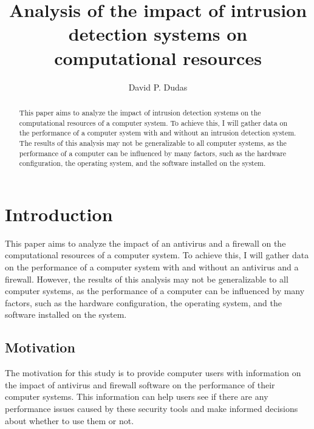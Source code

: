 \documentclass[runningheads,a4paper,english]{llncs}[2022/01/12]
\begin{document}
\title{Analysis of the impact of intrusion detection systems on computational resources}

\author{David P. Dudas}


\maketitle

\begin{abstract}

This paper aims to analyze the impact of intrusion detection systems on the
computational resources of a computer system. To achieve this, I will gather
data on the performance of a computer system with and without an intrusion
detection system. The results of this analysis may not be generalizable to all
computer systems, as the performance of a computer can be influenced by many
factors, such as the hardware configuration, the operating system, and the
software installed on the system.

\end{abstract}


\section{Introduction}
\label{sec:introduction}

\par This paper aims to analyze the impact of an antivirus and a firewall on
the computational resources of a computer system. To achieve this, I will
gather data on the performance of a computer system with and without an
antivirus and a firewall. However, the results of this analysis may not be
generalizable to all computer systems, as the performance of a computer can be
influenced by many factors, such as the hardware configuration, the operating
system, and the software installed on the system.

\subsection{Motivation}
\label{sec:motivation}

\par The motivation for this study is to provide computer users with
information on the impact of antivirus and firewall software on the performance
of their computer systems. This information can help users see if there are any
performance issues caused by these security tools and make informed decisions
about whether to use them or not.
\end{document}
